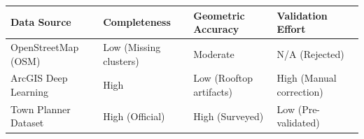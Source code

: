 
\begin{tabular}{p{} p{} p{} p{}}
\toprule
\textbf{Data Source} & \textbf{Completeness} & \textbf{Geometric Accuracy} & \textbf{Validation Effort} \\
\midrule
OpenStreetMap (OSM) & Low (Missing clusters) & Moderate & N/A (Rejected) \\
ArcGIS Deep Learning & High & Low (Rooftop artifacts) & High (Manual correction) \\
Town Planner Dataset & High (Official) & High (Surveyed) & Low (Pre-validated) \\
\bottomrule
\end{tabular}
